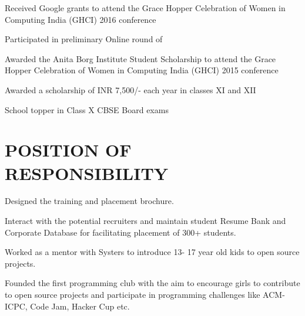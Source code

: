 \documentclass[]{resume-openfont}
\begin{document}
\begin{minipage}[t]{0.68\textwidth}
\sectionsep
\sectionsep

\begin{tightemize}
\item {}
\item {}
\item Received Google grants to attend the Grace Hopper Celebration of Women in Computing India (GHCI) 2016 conference
\item Participated in preliminary Online round of 
\item Awarded the Anita Borg Institute Student Scholarship to attend the Grace Hopper Celebration of Women in Computing India (GHCI) 2015 conference
\item Awarded a scholarship of INR 7,500/-  each year in classes XI and XII
\item School topper in Class X CBSE Board exams
\end{tightemize}
\sectionsep


\section{POSITION OF RESPONSIBILITY}

\begin{tightemize}
\item Designed the training and placement brochure.
\item Interact with the potential recruiters and maintain student Resume Bank and Corporate Database for facilitating placement of 300+ students.
\end{tightemize}
\sectionsep

Worked as a mentor with Systers to introduce 13- 17 year old kids to open source projects. 
\sectionsep

Founded the first programming club with the aim to encourage girls to contribute to open source projects and participate in programming challenges like ACM- ICPC, Code Jam, Hacker Cup etc.
\sectionsep


\end{minipage}
\end{document}
